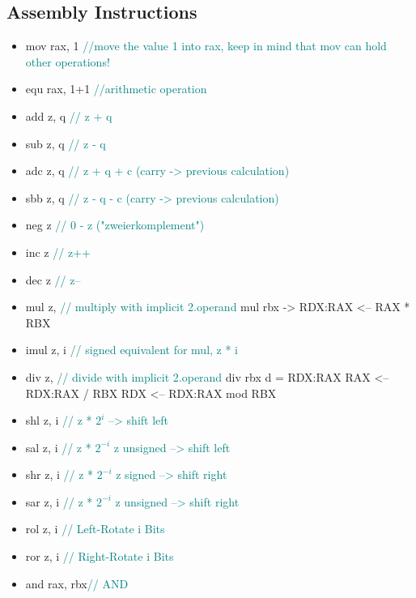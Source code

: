 \documentclass[main.tex,fontsize=7pt,paper=a4,paper=landscape,DIV=calc,]{scrartcl}
\begin{document}
\begin{multicols*}{4}
\subsection{Assembly Instructions}
\begin{itemize}
\item mov rax, 1 \textcolor{teal}{//move the value 1 into rax, keep in mind that mov can hold other operations!}
\item equ rax, 1+1 \textcolor{teal}{//arithmetic operation}
\item add z,   q  \textcolor{teal}{// z + q} 
\item sub z,   q  \textcolor{teal}{// z - q}
\item adc z,   q  \textcolor{teal}{// z + q + c (carry -> previous calculation)}
\item sbb z,   q  \textcolor{teal}{// z - q - c (carry -> previous calculation)}
\item neg z       \textcolor{teal}{// 0 - z ("zweierkomplement")}
\item inc z       \textcolor{teal}{// z++ }
\item dec z       \textcolor{teal}{// z-- }
\item mul z,      \textcolor{teal}{// multiply with implicit 2.operand }\newline
mul rbx -> RDX:RAX <-- RAX * RBX
\item imul z,   i  \textcolor{teal}{// signed equivalent for mul, z * i }
\item div z,      \textcolor{teal}{// divide with implicit 2.operand}\newline
div rbx  \newline
d = RDX:RAX\newline
RAX <-- RDX:RAX / RBX\newline
RDX <-- RDX:RAX mod RBX
\item shl z,   i  \textcolor{teal}{// z * \(2^i\)               --> shift left}
\item sal z,   i  \textcolor{teal}{// z * \(2^{-i}\) z unsigned --> shift left}
\item shr z,   i  \textcolor{teal}{// z * \(2^{-i}\) z signed   --> shift right}
\item sar z,   i  \textcolor{teal}{// z * \(2^{-i}\) z unsigned --> shift right}
\item rol z,   i  \textcolor{teal}{// Left-Rotate i Bits }
\item ror z,   i  \textcolor{teal}{// Right-Rotate i Bits }
\item and rax, rbx\textcolor{teal}{// AND}

\end{itemize}
\end{multicols*}
\end{document}
